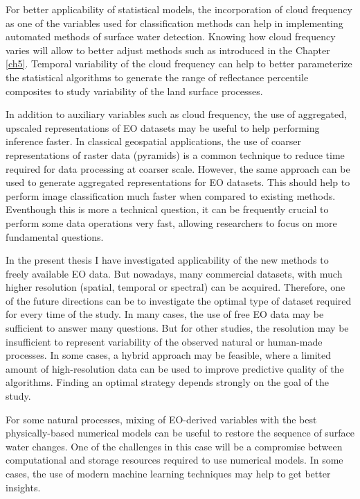For better applicability of statistical models, the incorporation of cloud frequency as one of the variables used for classification methods can help in implementing automated methods of surface water detection. Knowing how cloud frequency varies will allow to better adjust methods such as introduced in the Chapter \ref{ch5}. Temporal variability of the cloud frequency can help to better parameterize the statistical algorithms to generate the range of reflectance percentile composites to study variability of the land surface processes.

In addition to auxiliary variables such as cloud frequency, the use of aggregated, upscaled representations of \gls{EO} datasets may be useful to help performing inference faster. In classical geospatial applications, the use of coarser representations of raster data (pyramids) is a common technique to reduce time required for data processing at coarser scale. However, the same approach can be used to generate aggregated representations for \gls{EO} datasets. This should help to perform image classification much faster when compared to existing methods. Eventhough this is more a technical question, it can be frequently crucial to perform some data operations very fast, allowing researchers to focus on more fundamental questions.

In the present thesis I have investigated applicability of the new methods to freely available \gls{EO} data. But nowadays, many commercial datasets, with much higher resolution (spatial, temporal or spectral) can be acquired. Therefore, one of the future directions can be to investigate the optimal type of dataset required for every time of the study. In many cases, the use of free \gls{EO} data may be sufficient to answer many questions. But for other studies, the resolution may be insufficient to represent variability of the observed natural or human-made processes. In some cases, a hybrid approach may be feasible, where a limited amount of high-resolution data can be used to improve predictive quality of the algorithms. Finding an optimal strategy depends strongly on the goal of the study.

For some natural processes, mixing of EO-derived variables with the best physically-based numerical models can be useful to restore the sequence of surface water changes. One of the challenges in this case will be a compromise between computational and storage resources required to use numerical models. In some cases, the use of modern machine learning techniques may help to get better insights.
